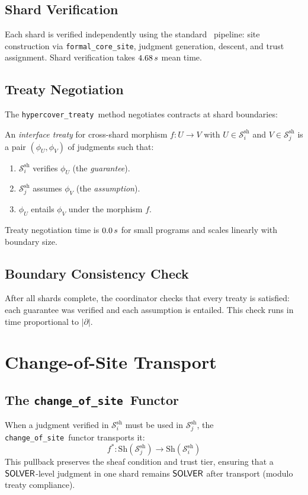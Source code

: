 \documentclass[11pt]{article}
\newcommand{\ShardSite}{\mathcal{S}^{\mathrm{sh}}}
\newcommand{\ChangeOfSite}{\texttt{change\_of\_site}}
\newcommand{\FormalCore}{\texttt{formal\_core\_site}}
\newcommand{\HypercoverTreaty}{\texttt{hypercover\_treaty}}
\begin{document}
\subsection{Shard Verification}
Each shard is verified independently using the standard \JuGeo\
pipeline: site construction via \FormalCore, judgment generation,
descent, and trust assignment.  Shard verification takes $4.68\,s$
mean time.

\subsection{Treaty Negotiation}
The \HypercoverTreaty\ method negotiates contracts at shard boundaries:

\begin{definition}[Interface Treaty]\label{def:treaty}
An \emph{interface treaty} for cross-shard morphism $f\colon U \to V$
with $U \in \ShardSite_i$ and $V \in \ShardSite_j$ is a pair
$(\phi_U, \phi_V)$ of judgments such that:
\begin{enumerate}[noitemsep]
  \item $\ShardSite_i$ verifies $\phi_U$ (the \emph{guarantee}).
  \item $\ShardSite_j$ assumes $\phi_V$ (the \emph{assumption}).
  \item $\phi_U$ entails $\phi_V$ under the morphism $f$.
\end{enumerate}
\end{definition}

Treaty negotiation time is $0.0\,s$ for small
programs and scales linearly with boundary size.

\subsection{Boundary Consistency Check}
After all shards complete, the coordinator checks that every treaty
is satisfied: each guarantee was verified and each assumption is
entailed.  This check runs in time proportional to $|\partial|$.

\section{Change-of-Site Transport}\label{sec:transport}

\subsection{The \ChangeOfSite\ Functor}
When a judgment verified in $\ShardSite_i$ must be used in
$\ShardSite_j$, the \ChangeOfSite\ functor transports it:
\[
  f^*\colon \mathrm{Sh}(\ShardSite_j) \to \mathrm{Sh}(\ShardSite_i)
\]
This pullback preserves the sheaf condition and trust tier, ensuring
that a $\mathsf{SOLVER}$-level judgment in one shard remains $\mathsf{SOLVER}$
after transport (modulo treaty compliance).
\end{document}
